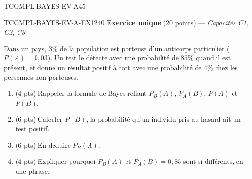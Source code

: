 

\begin{evaluation}{TCOMPL-BAYES-EV-A}{45}

\begin{exercice}{TCOMPL-BAYES-EV-A-EX1}{2}{40}
\textbf{Exercice unique} (20 points) --- \textit{Capacités C1, C2, C3}

\medskip

Dans un pays, $3\%$ de la population est porteuse d'un anticorps particulier ($P(A)=0{,}03$). Un test le détecte avec une probabilité de $85\%$ quand il est présent, et donne un résultat positif à tort avec une probabilité de $4\%$ chez les personnes non porteuses.
\begin{enumerate}
  \item (4 pts) Rappeler la formule de Bayes reliant $P_B(A)$, $P_A(B)$, $P(A)$ et $P(B)$.
  \item (6 pts) Calculer $P(B)$, la probabilité qu'un individu pris au hasard ait un test positif.
  \item (6 pts) En déduire $P_B(A)$.
  \item (4 pts) Expliquer pourquoi $P_B(A)$ et $P_A(B)=0{,}85$ sont si différents, en une phrase.
\end{enumerate}
\end{exercice}

\end{evaluation}
